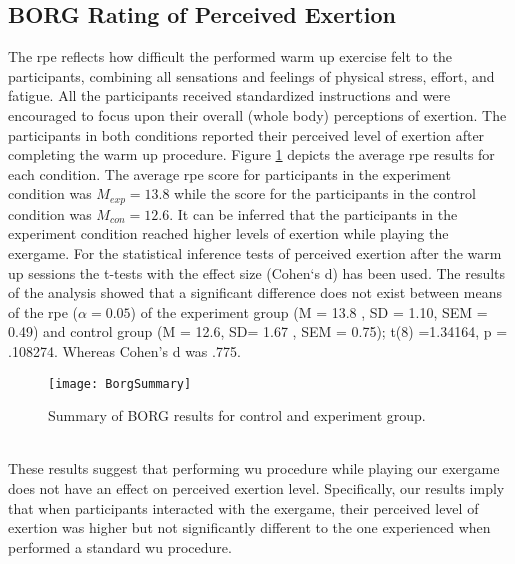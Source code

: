 \subsection{BORG Rating of Perceived Exertion}
The \acrfull{rpe} reflects how difficult the performed warm up exercise felt to the participants, combining all sensations and feelings of physical stress, effort, and fatigue. All the participants received standardized instructions and were encouraged to focus upon their overall (whole body) perceptions of exertion. The participants in both conditions reported their perceived level of exertion after completing the warm up procedure.  Figure \ref{fig:borg} depicts the average \gls{rpe}  results for each condition. The average \gls{rpe} score for participants in the experiment condition was   \begin{math}M_{exp} = 13.8 \end{math} while the score for the participants in the control condition was   \begin{math}M_{con} = 12.6 \end{math}. It can be inferred that the participants in the experiment condition reached higher levels of exertion while playing the exergame. For the statistical inference tests of perceived exertion after the warm up sessions the t-tests with the effect size (Cohen`s d) has been used. The results of the analysis showed that a significant difference does not exist  between means of the \gls{rpe} (\begin{math}\alpha = 0.05\end{math})  of the experiment group (M = 13.8 , SD = 1.10, SEM = 0.49) and control group (M = 12.6, SD= 1.67 , SEM = 0.75);  t(8) =1.34164, p = .108274. Whereas Cohen's d was .775.
\\
\begin{figure}[h]
    \centering
    \texttt{[image: BorgSummary]}
    \caption{Summary of BORG results for control and experiment group.}
    \label{fig:borg}
\end{figure}\\
These results suggest that performing \acrshort{wu} procedure while playing our exergame does not have an effect on perceived exertion level. Specifically, our results imply that when participants interacted with the exergame, their perceived level of exertion was higher but not significantly different to the one experienced when performed a standard \acrshort{wu} procedure.
